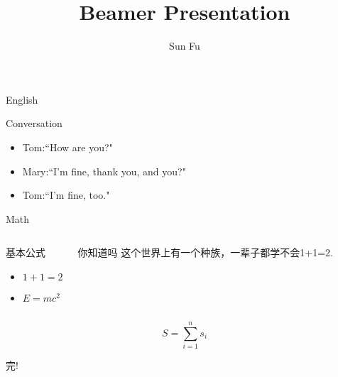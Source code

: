 \documentclass[xetex,mathserif,serif]{beamer}
\title{Beamer Presentation}
\subtitle{}
\author{Sun Fu}
\institute{NB University}
\begin{document}
\begin{frame}
    \titlepage
\end{frame}

\begin{frame}{English}
    \begin{block}{Conversation}
        \begin{itemize}
            \setlength{\itemindent}{10in}
            \item Tom:``How are you?"
            \item Mary:``I'm fine, thank you, and you?"
            \item Tom:``I'm fine, too."
        \end{itemize}
    \end{block}
\end{frame}

\begin{frame}{Math}
    \begin{columns}
        \begin{block}{基本公式}
            \begin{itemize}
                \setlength{\itemindent}{10in}
                \item $ 1+ 1 = 2$
                \item $ E = mc^2$
            \end{itemize}
        \end{block}
        \begin{alertblock}{你知道吗}
            这个世界上有一个种族，一辈子都学不会1+1=2.
        \end{alertblock}
    \end{columns}
    \centering
    \vskip8cm
    $$ S = \sum^{n}_{i=1} s_i$$
\end{frame}

\begin{frame}
    \centering
    {\Huge{完!}}
\end{frame}
\end{document}
